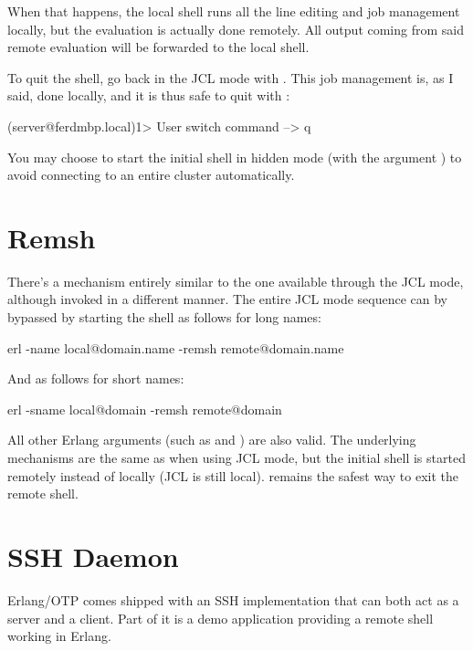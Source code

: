 When that happens, the local shell runs all the line editing and job management locally, but the evaluation is actually done remotely. All output coming from said remote evaluation will be forwarded to the local shell.

To quit the shell, go back in the JCL mode with . This job management is, as I said, done locally, and it is thus safe to quit with :

\begin{VerbatimEshell}
(server@ferdmbp.local)1>
User switch command
 --> q
\end{VerbatimEshell}

You may choose to start the initial shell in hidden mode (with the argument ) to avoid connecting to an entire cluster automatically.

\section{Remsh}

There's a mechanism entirely similar to the one available through the JCL mode, although invoked in a different manner. The entire JCL mode sequence can by bypassed by starting the shell as follows for long names:

\begin{VerbatimText}
erl -name local@domain.name -remsh remote@domain.name
\end{VerbatimText}

And as follows for short names:

\begin{VerbatimText}
erl -sname local@domain -remsh remote@domain
\end{VerbatimText}

All other Erlang arguments (such as  and ) are also valid. The underlying mechanisms are the same as when using JCL mode, but the initial shell is started remotely instead of locally (JCL is still local).   remains the safest way to exit the remote shell.

\section{SSH Daemon}

Erlang/OTP comes shipped with an SSH implementation that can both act as a server and a client. Part of it is a demo application providing a remote shell working in Erlang.

